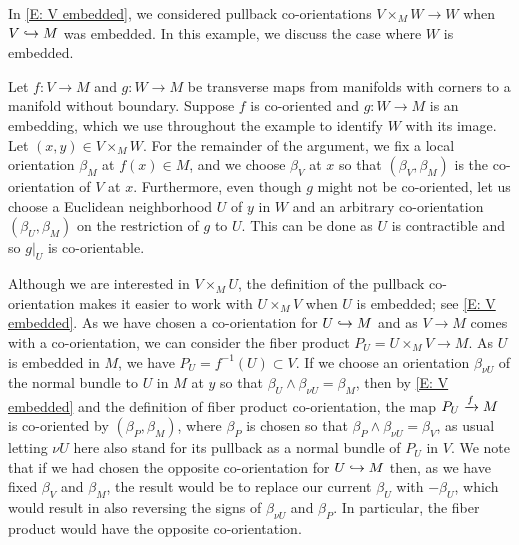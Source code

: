 \begin{example}\label{E: embedded}
	In \cref{E: V embedded}, we considered pullback co-orientations $V \times_M W \to W$ when $V \hookrightarrow M$ was embedded.
	In this example, we discuss the case where $W$ is embedded.

	Let $f \colon V \to M$ and $g \colon W \to M$ be transverse maps from manifolds with corners to a manifold without boundary.
	Suppose $f$ is co-oriented and $g \colon W \to M$ is an embedding, which we use throughout the example to identify $W$ with its image.
	Let $(x,y) \in V \times_M W$.
	For the remainder of the argument, we fix a local orientation $\beta_M$ at $f(x) \in M$, and we choose $\beta_V$ at $x$ so that $(\beta_V,\beta_M)$ is the co-orientation of $V$ at $x$.
	Furthermore, even though $g$ might not be co-oriented, let us choose a Euclidean neighborhood $U$ of $y$ in $W$ and an arbitrary co-orientation $(\beta_U,\beta_M)$ on the restriction of $g$ to $U$.
	This can be done as $U$ is contractible and so $g|_U$ is co-orientable.

	Although we are interested in $V \times_M U$, the definition of the pullback co-orientation makes it easier to work with $U \times_M V$ when $U$ is embedded; see \cref{E: V embedded}.
	As we have chosen a co-orientation for $U \hookrightarrow M$ and as $V \to M$ comes with a co-orientation, we can consider the fiber product $P_U = U \times_M V \to M$.
	As $U$ is embedded in $M$, we have $P_U = f^{-1}(U) \subset V$.
	If we choose an orientation $\beta_{\nu U}$ of the normal bundle to $U$ in $M$ at $y$ so that $\beta_U \wedge \beta_{\nu U} = \beta_M$, then by \cref{E: V embedded} and the definition of fiber product co-orientation, the map $P_U \xrightarrow{f} M$ is co-oriented by $(\beta_P,\beta_M)$, where $\beta_P$ is chosen so that $\beta_P \wedge \beta_{\nu U} = \beta_V$, as usual letting $\nu U$ here also stand for its pullback as a normal bundle of $P_U$ in $V$.
	We note that if we had chosen the opposite co-orientation for $U \hookrightarrow M$ then, as we have fixed $\beta_V$ and $\beta_M$, the result would be to replace our current $\beta_U$ with $-\beta_U$, which would result in also reversing the signs of $\beta_{\nu U}$ and $\beta_P$.
	In particular, the fiber product would have the opposite co-orientation.


\end{example}
